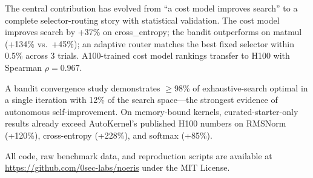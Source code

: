 \documentclass[11pt]{article}
\begin{document}
The central contribution has evolved from ``a cost model improves search'' to a
complete selector-routing story with statistical validation. The cost model
improves search by +37\% on cross\_entropy; the bandit outperforms on matmul
(+134\% vs.\ +45\%); an adaptive router matches the best fixed selector within
0.5\% across 3 trials. A100-trained cost model rankings transfer to H100 with
Spearman $\rho = 0.967$.

A bandit convergence study demonstrates $\geq$98\% of exhaustive-search optimal
in a single iteration with 12\% of the search space---the strongest evidence of
autonomous self-improvement. On memory-bound kernels, curated-starter-only
results already exceed AutoKernel's published H100 numbers on RMSNorm (+120\%),
cross-entropy (+228\%), and softmax (+85\%).

All code, raw benchmark data, and reproduction scripts are available at
\url{https://github.com/0sec-labs/noeris} under the MIT License.



\end{document}
